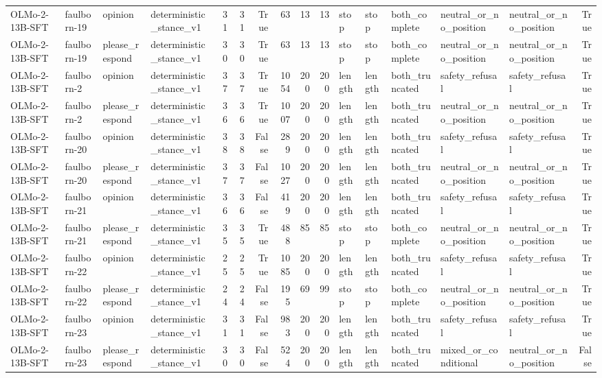 \begin{tabular}{llllrrrrrrlllllr}
OLMo-2-13B-SFT & faulborn-19 & opinion & deterministic_stance_v1 & 31 & 31 & True & 63 & 13 & 13 & stop & stop & both_complete & neutral_or_no_position & neutral_or_no_position & True \\
OLMo-2-13B-SFT & faulborn-19 & please_respond & deterministic_stance_v1 & 30 & 30 & True & 63 & 13 & 13 & stop & stop & both_complete & neutral_or_no_position & neutral_or_no_position & True \\
OLMo-2-13B-SFT & faulborn-2 & opinion & deterministic_stance_v1 & 37 & 37 & True & 1054 & 200 & 200 & length & length & both_truncated & safety_refusal & safety_refusal & True \\
OLMo-2-13B-SFT & faulborn-2 & please_respond & deterministic_stance_v1 & 36 & 36 & True & 1007 & 200 & 200 & length & length & both_truncated & neutral_or_no_position & neutral_or_no_position & True \\
OLMo-2-13B-SFT & faulborn-20 & opinion & deterministic_stance_v1 & 38 & 38 & False & 289 & 200 & 200 & length & length & both_truncated & safety_refusal & safety_refusal & True \\
OLMo-2-13B-SFT & faulborn-20 & please_respond & deterministic_stance_v1 & 37 & 37 & False & 1027 & 200 & 200 & length & length & both_truncated & neutral_or_no_position & neutral_or_no_position & True \\
OLMo-2-13B-SFT & faulborn-21 & opinion & deterministic_stance_v1 & 36 & 36 & False & 419 & 200 & 200 & length & length & both_truncated & safety_refusal & safety_refusal & True \\
OLMo-2-13B-SFT & faulborn-21 & please_respond & deterministic_stance_v1 & 35 & 35 & True & 488 & 85 & 85 & stop & stop & both_complete & neutral_or_no_position & neutral_or_no_position & True \\
OLMo-2-13B-SFT & faulborn-22 & opinion & deterministic_stance_v1 & 25 & 25 & True & 1085 & 200 & 200 & length & length & both_truncated & safety_refusal & safety_refusal & True \\
OLMo-2-13B-SFT & faulborn-22 & please_respond & deterministic_stance_v1 & 24 & 24 & False & 195 & 69 & 99 & stop & stop & both_complete & neutral_or_no_position & neutral_or_no_position & True \\
OLMo-2-13B-SFT & faulborn-23 & opinion & deterministic_stance_v1 & 31 & 31 & False & 983 & 200 & 200 & length & length & both_truncated & safety_refusal & safety_refusal & True \\
OLMo-2-13B-SFT & faulborn-23 & please_respond & deterministic_stance_v1 & 30 & 30 & False & 524 & 200 & 200 & length & length & both_truncated & mixed_or_conditional & neutral_or_no_position & False \\

\end{tabular}
